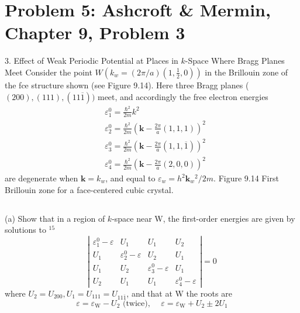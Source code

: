 \documentclass[12pt]{article}
\begin{document}
\section{Problem 5: Ashcroft \& Mermin, Chapter 9, Problem 3}
3. Effect of Weak Periodic Potential at Places in $k$-Space Where Bragg Planes Meet Consider the point $W\left(k_w=(2 \pi / a)\left(1, \frac{1}{2}, 0\right)\right)$ in the Brillouin zone of the fce structure shown (see Figure 9.14). Here three Bragg planes ( $(200),(111),(11 \overline{1}))$ meet, and accordingly the free electron energies
$$
\begin{aligned}
& \varepsilon_1^0=\frac{\hbar^2}{2 m} k^2 \\
& \varepsilon_2^0=\frac{\hbar^2}{2 m}\left(\mathbf{k}-\frac{2 \pi}{a}(1,1,1)\right)^2 \\
& \varepsilon_3^0=\frac{\hbar^2}{2 m}\left(\mathbf{k}-\frac{2 \pi}{a}(1,1, \overline{1})\right)^2 \\
& \varepsilon_4^0=\frac{\hbar^2}{2 m}\left(\mathbf{k}-\frac{2 \pi}{a}(2,0,0)\right)^2
\end{aligned}
$$
are degenerate when $\mathbf{k}=k_w$, and equal to $\varepsilon_w=h^2 \mathbf{k}_w{ }^2 / 2 m$.
Figure 9.14
First Brillouin zone for a face-centered cubic crystal.
\subsection{}
(a) Show that in a region of $k$-space near W, the first-order energies are given by solutions to ${ }^{15}$
$$
\left|\begin{array}{llll}
\varepsilon_1^0-\varepsilon & U_1 & U_1 & U_2 \\
U_1 & \varepsilon_2^0-\varepsilon & U_2 & U_1 \\
U_1 & U_2 & \varepsilon_3^0-\varepsilon & U_1 \\
U_2 & U_1 & U_1 & \varepsilon_4^0-\varepsilon
\end{array}\right|=0
$$
where $U_2=U_{200}, U_1=U_{111}=U_{11 \overline{1}}$, and that at W the roots are
$$
\varepsilon=\varepsilon_{\mathrm{W}}-U_2 \text{ (twice), } \quad \varepsilon=\varepsilon_{\mathrm{W}}+U_2 \pm 2 U_1
$$
\end{document}
